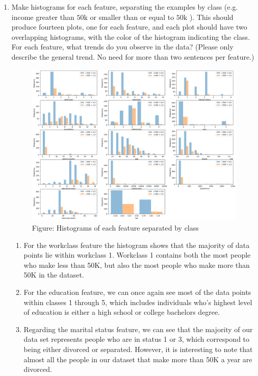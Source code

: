 \documentclass[letterpaper]{article}
\theoremstyle{definition}
\begin{document}
\begin{enumerate}
\begin{enumerate}
\item Make histograms for each feature, separating the examples by
class (e.g. income greater than \(50 \mathrm{k}\) or smaller than
or equal to \(50 \mathrm{k}\) ). This should produce fourteen
plots, one for each feature, and each plot should have two
overlapping histograms, with the color of the histogram
indicating the class. For each feature, what trends do you
observe in the data? (Please only describe the general trend. No
need for more than two sentences per feature.)

\begin{figure}[htbp]
\centering
\includegraphics[width=400]{../assets/hw2_fig1.png}
\caption{Figure: Histograms of each feature separated by class}
\end{figure}

\color{teal}
\begin{enumerate}
\item For the workclass feature the histogram shows that the
majority of data points lie within workclass 1. Workclass 1
contains both the most people who make less than 50K, but
also the most people who make more than 50K in the dataset.

\item For the education feature, we can once again see most of the
data points within classes 1 through 5, which includes
individuals who's highest level of education is either a high
school or college bachelors degree.

\item Regarding the marital status feature, we can see that the
majority of our data set represents people who are in status
1 or 3, which correspond to being either divorced or
separated. However, it is interesting to note that almost all
the people in our dataset that make more than 50K a year are
divorced.


\end{enumerate}
\end{enumerate}
\end{enumerate}
\end{document}
